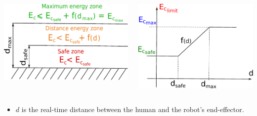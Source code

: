 \begin{frame}
{\begin{columns}
                \begin{center}
                        \includegraphics[width=\textwidth ]{figures/niveauEnergie_dessin.pdf}
                        \end{center}

                \begin{center}
                        \includegraphics[width=\textwidth ]{figures/niveauEnergie_graph2.pdf}
                        \end{center}
\end{columns}  
\vspace{2mm} 
\begin{itemize}
\item $d$ is the real-time distance between the human and the robot's end-effector.
\end{itemize}}


\end{frame}




